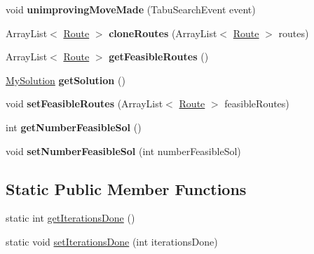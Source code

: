 \begin{DoxyCompactItemize}
\item 
void {\bfseries unimproving\+Move\+Made} (Tabu\+Search\+Event event)\hypertarget{classtabu_1_1_my_search_program_a01133cb962e6638948337787530b5f19}{}\label{classtabu_1_1_my_search_program_a01133cb962e6638948337787530b5f19}

\item 
Array\+List$<$ \hyperlink{classsvrptw_1_1_route}{Route} $>$ {\bfseries clone\+Routes} (Array\+List$<$ \hyperlink{classsvrptw_1_1_route}{Route} $>$ routes)\hypertarget{classtabu_1_1_my_search_program_a8fbf7d634af9dcea20ccc3c823c887b0}{}\label{classtabu_1_1_my_search_program_a8fbf7d634af9dcea20ccc3c823c887b0}

\item 
Array\+List$<$ \hyperlink{classsvrptw_1_1_route}{Route} $>$ {\bfseries get\+Feasible\+Routes} ()\hypertarget{classtabu_1_1_my_search_program_a0085e8cfeb3b5722aff34053274c36f5}{}\label{classtabu_1_1_my_search_program_a0085e8cfeb3b5722aff34053274c36f5}

\item 
\hyperlink{classtabu_1_1_my_solution}{My\+Solution} {\bfseries get\+Solution} ()\hypertarget{classtabu_1_1_my_search_program_a24e83e8d31f1bf07a8581149234dfbd5}{}\label{classtabu_1_1_my_search_program_a24e83e8d31f1bf07a8581149234dfbd5}

\item 
void {\bfseries set\+Feasible\+Routes} (Array\+List$<$ \hyperlink{classsvrptw_1_1_route}{Route} $>$ feasible\+Routes)\hypertarget{classtabu_1_1_my_search_program_a45fcb1e670da57244c0716c243b37def}{}\label{classtabu_1_1_my_search_program_a45fcb1e670da57244c0716c243b37def}

\item 
int {\bfseries get\+Number\+Feasible\+Sol} ()\hypertarget{classtabu_1_1_my_search_program_ac88d5ac0cc1823828184590c49892c70}{}\label{classtabu_1_1_my_search_program_ac88d5ac0cc1823828184590c49892c70}

\item 
void {\bfseries set\+Number\+Feasible\+Sol} (int number\+Feasible\+Sol)\hypertarget{classtabu_1_1_my_search_program_a0ae6ae03d18636d5adb7969b6aafec02}{}\label{classtabu_1_1_my_search_program_a0ae6ae03d18636d5adb7969b6aafec02}

\end{DoxyCompactItemize}
\subsection*{Static Public Member Functions}
\begin{DoxyCompactItemize}
\item 
static int \hyperlink{classtabu_1_1_my_search_program_a48da69244d771d1a311e3d3cba2bcbe0}{get\+Iterations\+Done} ()
\item 
static void \hyperlink{classtabu_1_1_my_search_program_a39b435769b35462de1a5a23b0f73e878}{set\+Iterations\+Done} (int iterations\+Done)
\end{DoxyCompactItemize}
